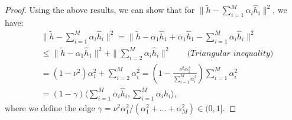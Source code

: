 \begin{proof}
Using the above results, we can show that for $\|\tilde{h} - \sum_{i=1}^M\alpha_i\hat{h}_i\|^2$, we have:
\begin{align}
\label{eq:before_high_prob}
&\|\tilde{h} - \sum_{i=1}^M\alpha_i\hat{h}_i\|^2 = \|\tilde{h} - \alpha_1\hat{h}_1 + \alpha_1\hat{h}_1 - \sum_{i=1}^M\alpha_i\hat{h}_i \|^2 \nonumber\\
&\leq \|\tilde{h} - \alpha_1\hat{h}_1\|^2 + \|\sum_{i=2}^M \alpha_i\hat{h}_i\|^2 \;\;\;\;\;\;\; \textit{(Triangular inequality)} \nonumber\\
& = (1-\nu^2)\alpha_1^2 + \sum_{i=2}^M \alpha_i^2 =  (1 - \frac{\nu^2\alpha_1^2}{\sum_{i=1}^M \alpha_i^2})\sum_{i=1}^M\alpha_i^2 \nonumber\\
& = (1-\gamma)\langle\sum_{i=1}^M \alpha_i\hat{h}_i, \sum_{i=1}^M\alpha_i\hat{h}_i\rangle,
\end{align} where we define the edge $\gamma = \nu^2\alpha_1^2/(\alpha_1^2+...+\alpha_M^2)\in (0, 1]$. 


\end{proof}
